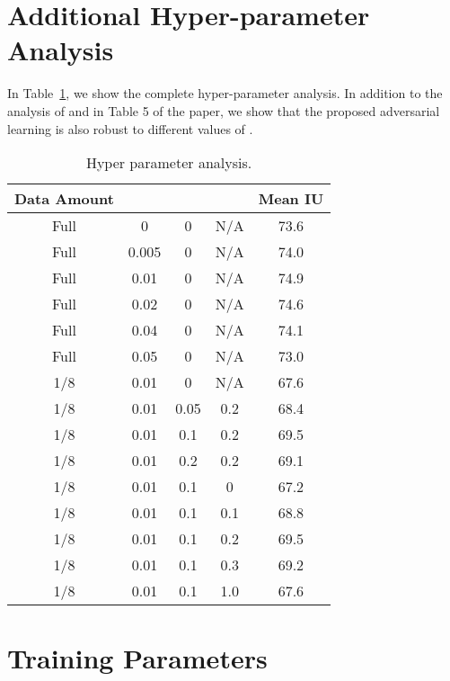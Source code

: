 \documentclass{bmvc2k}
\begin{document}
	\section{Additional Hyper-parameter Analysis}
	In Table~\ref{table: hyper}, we show the complete hyper-parameter analysis.
In addition to the analysis of  and  in Table 5 of the paper, we show that the proposed adversarial learning is also robust to different values of .
	
	
	\begin{table}[h]
		\caption{Hyper parameter analysis.}
		\small
		\vspace{2mm}
		\label{table: hyper}
		\centering
		\begin{tabular}{ccccc}
			\toprule
			Data Amount &  &  &  & Mean IU\\
			\midrule
			Full & 0 & 0 & N/A & 73.6 \\
			Full&0.005&	0&	N/A	&74.0\\
			Full&0.01&	0&	N/A	&74.9\\
			Full&0.02&	0&	N/A	&74.6\\
			Full&0.04&	0&	N/A	&74.1\\
			Full&0.05& 0 & N/A & 73.0 \\
			\midrule
			1/8&0.01&	0&	N/A	&67.6\\
			1/8	&0.01&	0.05&	0.2&	68.4\\
			1/8	&0.01&	0.1&	0.2&	69.5\\
			1/8	&0.01&	0.2&	0.2&	69.1\\
			\midrule
			1/8	&0.01&	0.1	&0&	 67.2\\
			1/8	&0.01&	0.1	&0.1&	68.8\\
			1/8	&0.01&	0.1&	0.2&	69.5\\
			1/8	&0.01&	0.1	&0.3&	69.2\\
			1/8	&0.01&	0.1	&1.0&	67.6\\
			\bottomrule
		\end{tabular}
	\end{table}
	
	
	\section{Training Parameters}
	
\end{document}
